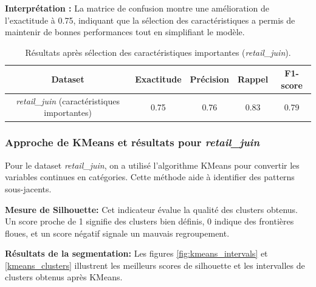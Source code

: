 \textbf{Interprétation :} La matrice de confusion montre une amélioration de l'exactitude à 0.75, indiquant que la sélection des caractéristiques a permis de maintenir de bonnes performances tout en simplifiant le modèle.

\begin{table}[H]
    \centering
    \begin{tabular}{|c|c|c|c|c|}
        \hline
        \textbf{Dataset} & \textbf{Exactitude} & \textbf{Précision} & \textbf{Rappel} & \textbf{F1-score} \\
        \hline
        \textit{retail\_juin} (caractéristiques importantes) & 0.75 & 0.76 & 0.83 & 0.79 \\
        \hline
    \end{tabular}
    \caption{Résultats après sélection des caractéristiques importantes (\textit{retail\_juin}).}
\end{table}

\subsubsection{Approche de KMeans et résultats pour \textit{retail\_juin}}

Pour le dataset \textit{retail\_juin}, on a utilisé l'algorithme KMeans pour convertir les variables continues en catégories. Cette méthode aide à identifier des patterns sous-jacents.

\textbf{Mesure de Silhouette:} Cet indicateur évalue la qualité des clusters obtenus. Un score proche de 1 signifie des clusters bien définis, 0 indique des frontières floues, et un score négatif signale un mauvais regroupement.

\textbf{Résultats de la segmentation:} Les figures \ref{fig:kmeans_intervals} et \ref{kmeans_clusters} illustrent les meilleurs scores de silhouette et les intervalles de clusters obtenus après KMeans.

